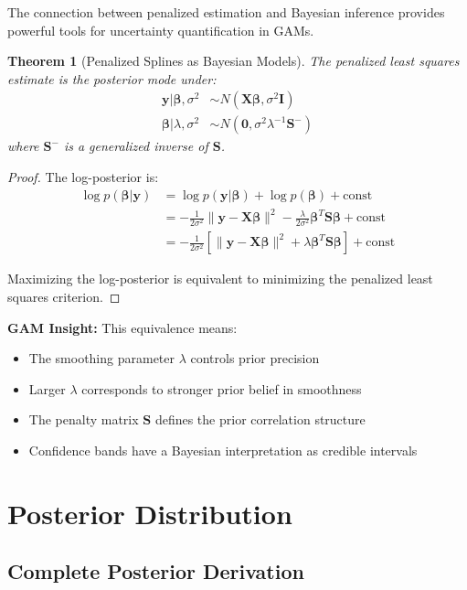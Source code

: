 \documentclass[12pt]{article}
\newtheorem{theorem}{Theorem}
\begin{document}
The connection between penalized estimation and Bayesian inference provides powerful tools for uncertainty quantification in GAMs.

\begin{theorem}[Penalized Splines as Bayesian Models]
The penalized least squares estimate is the posterior mode under:
\begin{align}
\mathbf{y} | \bm{\beta}, \sigma^2 &\sim N(\mathbf{X}\bm{\beta}, \sigma^2\mathbf{I}) \\
\bm{\beta} | \lambda, \sigma^2 &\sim N(\mathbf{0}, \sigma^2\lambda^{-1}\mathbf{S}^{-})
\end{align}
where $\mathbf{S}^{-}$ is a generalized inverse of $\mathbf{S}$.
\end{theorem}

\begin{proof}
The log-posterior is:
\begin{align}
\log p(\bm{\beta}|\mathbf{y}) &= \log p(\mathbf{y}|\bm{\beta}) + \log p(\bm{\beta}) + \text{const} \\
&= -\frac{1}{2\sigma^2}\|\mathbf{y} - \mathbf{X}\bm{\beta}\|^2 - \frac{\lambda}{2\sigma^2}\bm{\beta}^T\mathbf{S}\bm{\beta} + \text{const} \\
&= -\frac{1}{2\sigma^2}\left[\|\mathbf{y} - \mathbf{X}\bm{\beta}\|^2 + \lambda\bm{\beta}^T\mathbf{S}\bm{\beta}\right] + \text{const}
\end{align}

Maximizing the log-posterior is equivalent to minimizing the penalized least squares criterion.
\end{proof}

\textbf{GAM Insight:} This equivalence means:
\begin{itemize}
    \item The smoothing parameter $\lambda$ controls prior precision
    \item Larger $\lambda$ corresponds to stronger prior belief in smoothness
    \item The penalty matrix $\mathbf{S}$ defines the prior correlation structure
    \item Confidence bands have a Bayesian interpretation as credible intervals
\end{itemize}

\section{Posterior Distribution}

\subsection{Complete Posterior Derivation}
\end{document}
